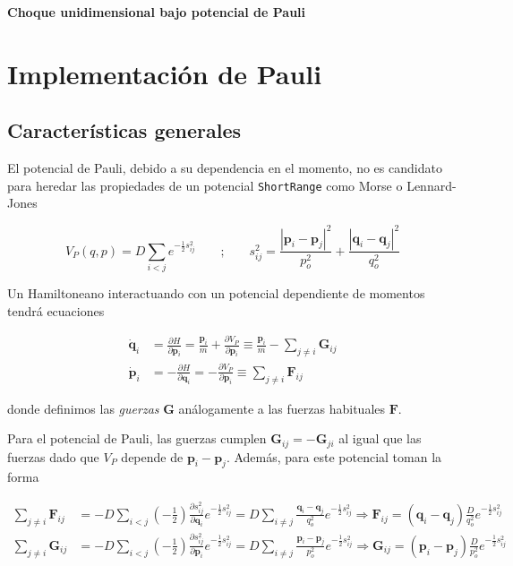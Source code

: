 \documentclass[twoside, 12pt]{article}
\providecommand{\dpart}[2]{\frac{\partial#1}{\partial#2}}
\begin{document}
	
\begin{center}
	{\fontsize{20pt}{10pt}\textbf{Choque unidimensional bajo potencial de Pauli}}
\end{center}

\section{Implementación de Pauli}

\subsection{Características generales}

El potencial de Pauli, debido a su dependencia en el momento, no es candidato para heredar las propiedades de un potencial \texttt{ShortRange} como Morse o Lennard-Jones

\[ V_{P}(q,p) = D\sum_{i<j} e^{-\frac{1}{2}s_{ij}^2} \qquad \text{;} \qquad s_{ij}^2 = \frac{|\mathbf{p}_i - \mathbf{p}_j|^2}{p_o^2} + \frac{|\mathbf{q}_i - \mathbf{q}_j|^2}{q_o^2}\]

Un Hamiltoneano interactuando con un potencial dependiente de momentos tendrá ecuaciones

\begin{align*}
\dot{\mathbf{q}}_i &= \dpart{H}{\mathbf{p}_i} = \frac{\mathbf{p}_i}{m} + \dpart{V_P}{\mathbf{p}_i} \equiv \frac{\mathbf{p}_i}{m} - \sum_{j\neq i} \mathbf{G}_{ij} \\ 
\dot{\mathbf{p}}_i &= -\dpart{H}{\mathbf{q}_i} = -\dpart{V_P}{\mathbf{p}_i} \equiv \sum_{j\neq i} \mathbf{F}_{ij}
\end{align*}

donde definimos las \textit{guerzas} $\mathbf{G}$ análogamente a las fuerzas habituales $\mathbf{F}$. 

Para el potencial de Pauli, las guerzas cumplen $\mathbf{G}_{ij} = -\mathbf{G}_{ji}$ al igual que las fuerzas dado que $V_P$ depende de $\mathbf{p}_i - \mathbf{p}_j$. Además, para este potencial toman la forma

\begin{align*}
\sum_{j\neq i} \mathbf{F}_{ij} &= -D \sum_{i<j} \left(-\frac{1}{2}\right)\dpart{s_{ij}^2}{\mathbf{q}_i}e^{-\frac{1}{2}s_{ij}^2} = D \sum_{i\neq j} \frac{\mathbf{q}_i - \mathbf{q}_j}{q_o^2}e^{-\frac{1}{2}s_{ij}^2} \Longrightarrow \mathbf{F}_{ij} = (\mathbf{q}_i - \mathbf{q}_j)\frac{D}{q_o^2}e^{-\frac{1}{2}s_{ij}^2} \\
\sum_{j\neq i} \mathbf{G}_{ij} &= -D \sum_{i<j} \left(-\frac{1}{2}\right)\dpart{s_{ij}^2}{\mathbf{p}_i}e^{-\frac{1}{2}s_{ij}^2} = D \sum_{i\neq j} \frac{\mathbf{p}_i - \mathbf{p}_j}{p_o^2}e^{-\frac{1}{2}s_{ij}^2} \Longrightarrow \mathbf{G}_{ij} = (\mathbf{p}_i - \mathbf{p}_j)\frac{D}{p_o^2}e^{-\frac{1}{2}s_{ij}^2}
\end{align*}
\end{document}

